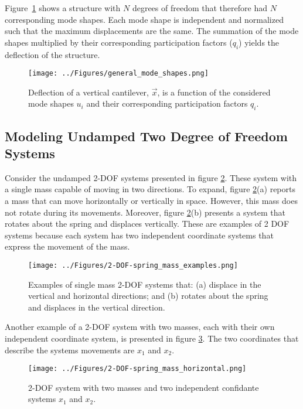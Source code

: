 \documentclass[12pt,letter]{article}
\numberwithin{ex}{section} %
\numberwithin{re}{section} %
\begin{document}
Figure~\ref{fig:general_mode_shapes} shows a structure with $N$ degrees of freedom that therefore had $N$ corresponding mode shapes. Each mode shape is independent and normalized such that the maximum displacements are the same. The summation of the mode shapes multiplied by their corresponding participation factors ($q_i$) yields the deflection of the structure. 


\begin{figure}[H]
	\centering
	\texttt{[image: ../Figures/general\_mode\_shapes.png]}
	\caption{Deflection of a vertical cantilever, $\vec{x}$, is a function of the considered mode shapes $u_i$ and their corresponding participation factors $q_i$.}
	\label{fig:general_mode_shapes}
\end{figure}





\subsection{Modeling Undamped Two Degree of Freedom Systems}
\label{sec:two_degree_of_freedom}

Consider the undamped 2-DOF systems presented in figure \ref{fig:2-DOF-spring_mass_examples}. These system with a single mass capable of moving in two directions. To expand, figure \ref{fig:2-DOF-spring_mass_examples}(a) reports a mass that can move horizontally or vertically in space. However, this mass does not rotate during its movements. Moreover, figure \ref{fig:2-DOF-spring_mass_examples}(b) presents a system that rotates about the spring and displaces vertically. These are examples of 2 DOF systems because each system has two independent coordinate systems that express the movement of the mass. 

\begin{figure}[H]
	\centering
	\texttt{[image: ../Figures/2-DOF-spring\_mass\_examples.png]}
	\caption{Examples of single mass 2-DOF systems that: (a) displace in the vertical and horizontal directions; and (b) rotates about the spring and displaces in the vertical direction. }
	\label{fig:2-DOF-spring_mass_examples}
\end{figure}

Another example of a 2-DOF system with two masses, each with their own independent coordinate system, is presented in figure \ref{fig:2-DOF-spring_mass_horizontal}. The two coordinates that describe the systems movements are $x_1$ and $x_2$.

\begin{figure}[H]
	\centering
	\texttt{[image: ../Figures/2-DOF-spring\_mass\_horizontal.png]}
	\caption{2-DOF system with two masses and two independent confidante systems $x_1$ and $x_2$.}
	\label{fig:2-DOF-spring_mass_horizontal}
\end{figure}
\end{document}
